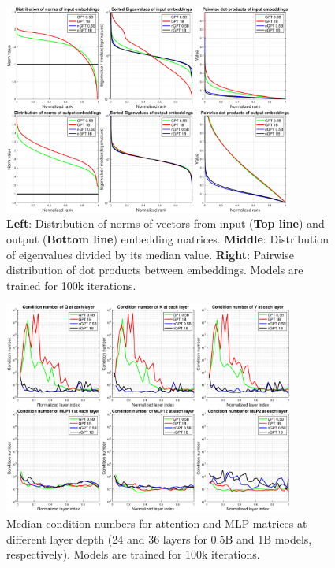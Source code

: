 \documentclass{article} %
\begin{document}
\begin{figure}[t]
\begin{center}
    \includegraphics[width=0.85\textwidth]{embeds.eps} 
\caption{\label{fig_embeddings} \textbf{Left}: Distribution of norms of vectors  from  input (\textbf{Top line}) and output (\textbf{Bottom line}) embedding matrices. \textbf{Middle}: Distribution of eigenvalues divided by its median value. \textbf{Right}: Pairwise distribution of dot products between embeddings. Models are trained for 100k iterations.}
\end{center}
\end{figure}

\begin{figure}[t]
\begin{center}
    \includegraphics[width=0.85\textwidth]{condnums.eps} 
\caption{\label{fig_cond} Median condition numbers  for attention and MLP matrices at different layer depth (24 and 36 layers for 0.5B and 1B models, respectively).  Models are trained for 100k iterations.}
\end{center}
\end{figure}
\end{document}
